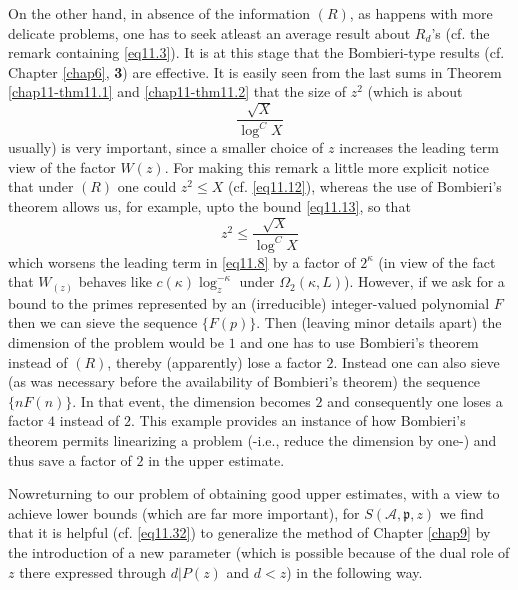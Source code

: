 On the other hand, in absence of the information $(R)$, as happens
with more delicate problems, one has to seek atleast an average result
about $R_d$'s (cf. the remark containing \eqref{eq11.3}). It is at this stage
that the Bombieri-type results (cf. Chapter \ref{chap6}, {\bf 3}) 
are effective. It is easily seen from the last sums in Theorem
\ref{chap11-thm11.1} and \ref{chap11-thm11.2} that 
the size of $z^2$ (which is about  
\begin{equation*}
\frac{\sqrt{X}} {\log^C X}\tag{11.13}\label{eq11.13}
\end{equation*}
usually) is very important, since a smaller choice of
$z$ increases the leading  term view of the factor $W(z)$. For making
this remark a little more explicit notice that under $(R)$ one could
$z^2 \le X$ (cf. \eqref{eq11.12}), whereas the use of Bombieri's theorem
allows us, for example, upto the bound \eqref{eq11.13}, so that 
\begin{equation*}
z^2 \le \frac{\sqrt{X}} {\log^C X}\tag{11.14}\label{eq11.14}
\end{equation*} 
which worsens the leading term in \eqref{eq11.8} by a factor of
$2^{\kappa}$ (in view of the fact that $W_{(z)}$ behaves like
$c(\kappa) \log ^{-\kappa}_z$ under $\Omega_2 (\kappa, L)$). 
However, if we ask for a bound to the
primes represented by an (irreducible) integer-valued polynomial $F$
then we can sieve the sequence $\{F(p)\}$. Then (leaving minor
details apart) the dimension of the problem would be $1$ and one has
to use  Bombieri's theorem instead of $(R)$, thereby (apparently)
lose a factor $2$. Instead one can also sieve (as was necessary before
the availability of Bombieri's theorem) the sequence  $\{ nF(n)\}$. In
that event, the dimension becomes $2$ and consequently one loses a
factor $4$ instead of $2$. This example provides an instance of how
Bombieri's theorem permits linearizing a problem (-i.e., reduce the
dimension by one-) and thus save a factor of $2$ in the upper estimate.  

Now\pageoriginale returning to our problem of obtaining  good upper
estimates, with 
a view to achieve lower bounds (which are far more important), for $ S
(\mathscr{A}, \mathfrak{p},z)$ we find that it is helpful
(cf. \eqref{eq11.32}) to generalize the method of Chapter \ref{chap9} by the
introduction of a new parameter (which is possible because of the
dual role of $z$ there expressed through $d |P(z)$ and $d < z$)
in the following way.  

